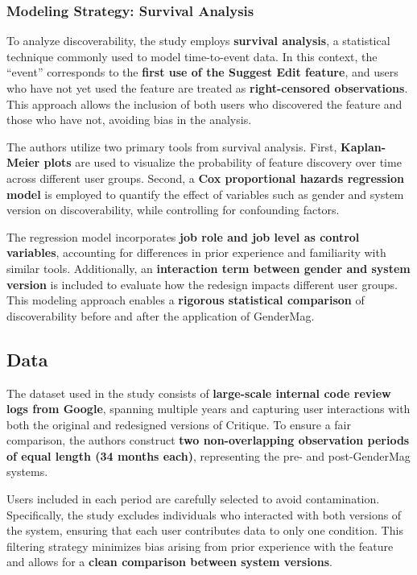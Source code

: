 \subsubsection{Modeling Strategy: Survival Analysis}
To analyze discoverability, the study employs \textbf{survival analysis}, a statistical technique commonly used to model time-to-event data. In this context, the “event” corresponds to the \textbf{first use of the Suggest Edit feature}, and users who have not yet used the feature are treated as \textbf{right-censored observations}. This approach allows the inclusion of both users who discovered the feature and those who have not, avoiding bias in the analysis.

The authors utilize two primary tools from survival analysis. First, \textbf{Kaplan-Meier plots} are used to visualize the probability of feature discovery over time across different user groups. Second, a \textbf{Cox proportional hazards regression model} is employed to quantify the effect of variables such as gender and system version on discoverability, while controlling for confounding factors.

The regression model incorporates \textbf{job role and job level as control variables}, accounting for differences in prior experience and familiarity with similar tools. Additionally, an \textbf{interaction term between gender and system version} is included to evaluate how the redesign impacts different user groups. This modeling approach enables a \textbf{rigorous statistical comparison} of discoverability before and after the application of GenderMag.

\subsection{Data}
The dataset used in the study consists of \textbf{large-scale internal code review logs from Google}, spanning multiple years and capturing user interactions with both the original and redesigned versions of Critique. To ensure a fair comparison, the authors construct \textbf{two non-overlapping observation periods of equal length (34 months each)}, representing the pre- and post-GenderMag systems.

Users included in each period are carefully selected to avoid contamination. Specifically, the study excludes individuals who interacted with both versions of the system, ensuring that each user contributes data to only one condition. This filtering strategy minimizes bias arising from prior experience with the feature and allows for a \textbf{clean comparison between system versions}.

